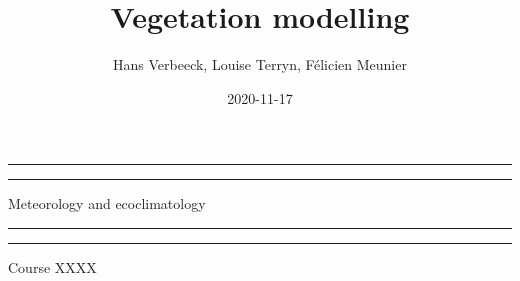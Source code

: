 \documentclass[oneside]{book}
\title{Vegetation modelling}
\author{Hans Verbeeck, Louise Terryn, Félicien Meunier}
\date{2020-11-17}
\begin{document}
\maketitle

\newcommand{\plogo}{\fbox{$\mathcal{PL}$}} %
\frontmatter


\begin{titlepage} %

	\centering %
	
	\scshape %
	
	\vspace*{\baselineskip} %
	
	
	\vspace{12\baselineskip}
	
	\rule{\textwidth}{1.6pt}\vspace*{-\baselineskip}\vspace*{2pt} %
	\rule{\textwidth}{0.4pt} %
	
	\vspace{0.75\baselineskip} %
	
	{\LARGE Meteorology and ecoclimatology\\} %
	
	\vspace{0.75\baselineskip} %
	
	\rule{\textwidth}{0.4pt}\vspace*{-\baselineskip}\vspace{3.2pt} %
	\rule{\textwidth}{1.6pt} %
	
	\vspace{2\baselineskip} %
	
	
	Course XXXX %
	
	\vspace*{3\baselineskip} %
	
	

\end{titlepage}
\end{document}

